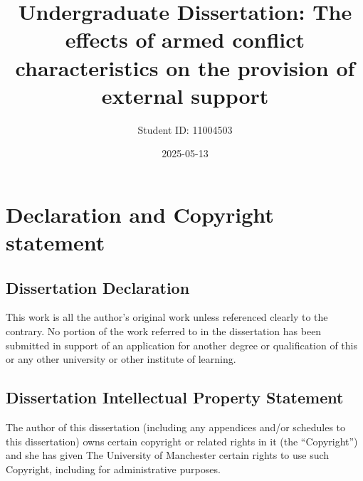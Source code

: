 \documentclass[
]{article}
\title{Undergraduate Dissertation: The effects of armed conflict
characteristics on the provision of external support}
\author{Student ID: 11004503}
\date{2025-05-13}
\begin{document}
\maketitle

{
\setcounter{tocdepth}{2}
\tableofcontents
}
\newpage

\section{Declaration and Copyright
statement}\label{declaration-and-copyright-statement}

\subsection{Dissertation Declaration}\label{dissertation-declaration}

This work is all the author's original work unless referenced clearly to
the contrary. No portion of the work referred to in the dissertation has
been submitted in support of an application for another degree or
qualification of this or any other university or other institute of
learning.

\subsection{Dissertation Intellectual Property
Statement}\label{dissertation-intellectual-property-statement}

The author of this dissertation (including any appendices and/or
schedules to this dissertation) owns certain copyright or related rights
in it (the ``Copyright'') and she has given The University of Manchester
certain rights to use such Copyright, including for administrative
purposes.
\end{document}
